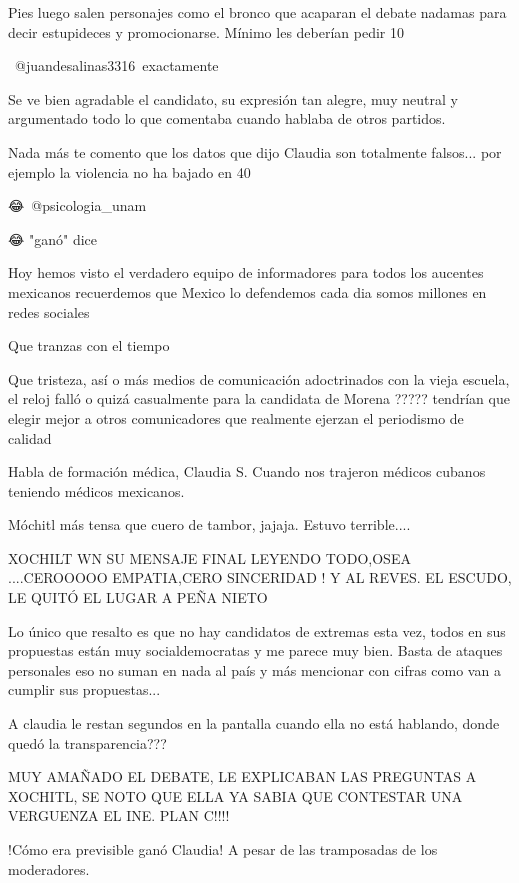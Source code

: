 Pies luego salen personajes como el bronco que acaparan el debate nadamas para decir estupideces y promocionarse. Mínimo les deberían pedir 10%

​ @juandesalinas3316 exactamente

Se ve bien agradable el candidato, su expresión tan alegre, muy neutral y argumentado todo lo que comentaba cuando hablaba de otros partidos.

Nada más te comento que los datos que dijo Claudia son totalmente falsos... por ejemplo la violencia no ha bajado en 40%

😂​ @psicologia_unam 

😂 "ganó" dice

Hoy hemos visto el verdadero equipo de informadores para todos los aucentes mexicanos recuerdemos que Mexico lo defendemos cada dia somos millones en redes sociales

Que tranzas con el tiempo

Que tristeza, así o más medios de comunicación adoctrinados con la vieja escuela, el reloj falló o quizá casualmente para la candidata de Morena ????? tendrían que elegir mejor a otros comunicadores que realmente ejerzan el periodismo de calidad

Habla de formación médica,  Claudia S. Cuando nos trajeron médicos cubanos teniendo médicos mexicanos.

Móchitl más tensa que cuero de tambor, jajaja. Estuvo terrible....

XOCHILT WN SU MENSAJE FINAL LEYENDO TODO,OSEA ....CEROOOOO EMPATIA,CERO SINCERIDAD ! Y AL REVES. EL ESCUDO, LE QUITÓ EL LUGAR A PEÑA NIETO

Lo único que resalto es que no hay candidatos de extremas esta vez, todos en sus propuestas están muy socialdemocratas y me parece muy bien. Basta de ataques personales eso no suman en nada al país y más mencionar con cifras como van a cumplir sus propuestas...

A claudia le restan segundos en la pantalla cuando ella no está hablando, donde quedó la transparencia???

MUY  AMAÑADO EL DEBATE, LE EXPLICABAN LAS PREGUNTAS A  XOCHITL,  SE NOTO QUE ELLA YA SABIA QUE CONTESTAR
UNA VERGUENZA EL INE.           PLAN C!!!!

!Cómo era previsible ganó Claudia! A pesar de las tramposadas de los moderadores.

